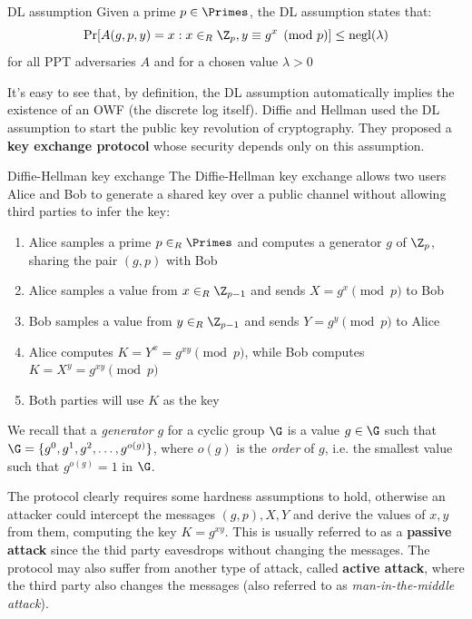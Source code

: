 \documentclass[a4paper, 12pt]{report}
\begin{document}
    \begin{framedass}{DL assumption}
        Given a prime $p \in \Primes$, the DL assumption states that:
        \[\Pr[A(g,p,y) = x : x \in_R \Z_p, y \equiv g^x \pmod p] \leq \mathrm{negl}(\lambda)\]
        for all PPT adversaries $A$ and for a chosen value $\lambda > 0$
    \end{framedass}

    It's easy to see that, by definition, the DL assumption automatically implies the existence of an OWF (the discrete log itself). Diffie and Hellman used the DL assumption to start the public key revolution of cryptography. They proposed a \textbf{key exchange protocol} whose security depends only on this assumption.

    \begin{framedalgo}{Diffie-Hellman key exchange}
        The Diffie-Hellman key exchange allows two users Alice and Bob to generate a shared key over a public channel without allowing third parties to infer the key:
        \begin{enumerate}
            \item Alice samples a prime $p \in_R \Primes$ and computes a generator $g$ of $\Z_p$, sharing the pair $(g,p)$ with Bob
            \item Alice samples a value from $x \in_R \Z_{p-1}$ and sends $X = g^{x} \pmod p$ to Bob
            \item Bob samples a value from $y \in_R \Z_{p-1}$ and sends $Y = g^{y} \pmod p$ to Alice
            \item Alice computes $K = Y^x = g^{xy} \pmod p$, while Bob computes $K = X^y = g^{xy} \pmod p$
            \item Both parties will use $K$ as the key
        \end{enumerate}
    \end{framedalgo}

    We recall that a \textit{generator} $g$ for a cyclic group $\G$ is a value $g \in \G$ such that $\G = \{g^{0}, g^1, g^2, \ldots, g^{o(g)}\}$, where $o(g)$ is the \textit{order} of $g$, i.e. the smallest value such that $g^{o(g)} = 1$ in $\G$.

    The protocol clearly requires some hardness assumptions to hold, otherwise an attacker could intercept the messages $(g,p), X, Y$ and derive the values of $x,y$ from them, computing the key $K = g^{xy}$. This is usually referred to as a \textbf{passive attack} since the thid party eavesdrops without changing the messages. The protocol may also suffer from another type of attack, called \textbf{active attack}, where the third party also changes the messages (also referred to as \textit{man-in-the-middle attack}).
    
\end{document}
